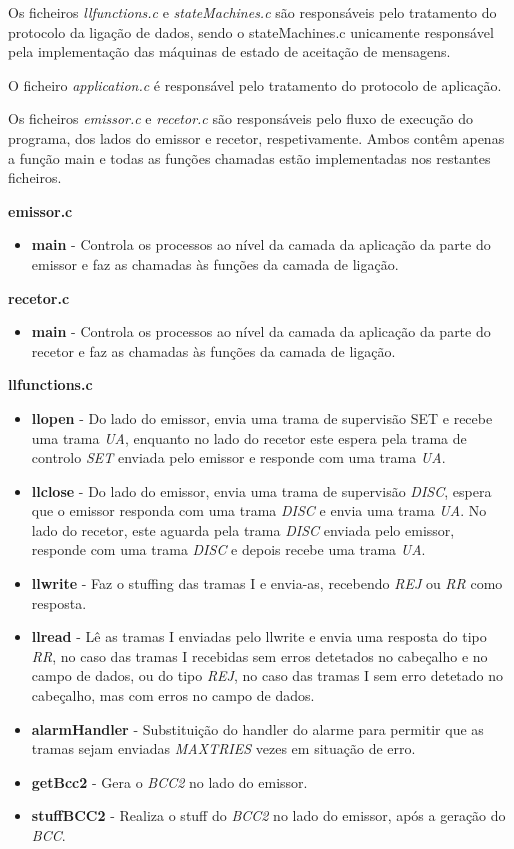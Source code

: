 \documentclass[11pt]{article}
\begin{document}
Os ficheiros \textit{llfunctions.c} e \textit{stateMachines.c} são responsáveis pelo tratamento do protocolo da ligação de dados, sendo o  stateMachines.c unicamente responsável pela implementação das máquinas de estado de aceitação de mensagens.

O ficheiro \textit{application.c} é responsável pelo tratamento do protocolo de aplicação.

Os ficheiros \textit{emissor.c} e \textit{recetor.c} são responsáveis pelo fluxo de execução do programa, dos lados do emissor e recetor, respetivamente. Ambos contêm apenas a função main e todas as funções chamadas estão implementadas nos restantes ficheiros.


\textbf{emissor.c}
\begin{itemize}
	\item \textbf{main} - Controla os processos ao nível da camada da aplicação da parte do emissor e faz as chamadas às funções da camada de ligação.
\end{itemize}


\textbf{recetor.c}
\begin{itemize}
	\item \textbf{main} - Controla os processos ao nível da camada da aplicação da parte do recetor e faz as chamadas às funções da camada de ligação.
\end{itemize}


\textbf{llfunctions.c}
\begin{itemize}
	\item \textbf{llopen} - Do lado do emissor, envia uma trama de supervisão SET e recebe uma trama \textit{UA}, enquanto no lado do recetor este espera pela trama de controlo \textit{SET} enviada pelo emissor e responde com uma trama \textit{UA}.
	\item \textbf{llclose} -  Do lado do emissor, envia uma trama de supervisão \textit{DISC}, espera que o emissor responda com uma trama \textit{DISC} e envia uma trama \textit{UA}. No lado do recetor, este aguarda pela trama \textit{DISC} enviada pelo emissor, responde com uma trama \textit{DISC} e depois recebe uma trama \textit{UA}.
	\item \textbf{llwrite} - Faz o stuffing das tramas I e envia-as, recebendo \textit{REJ} ou \textit{RR} como resposta.
	\item \textbf{llread} - Lê as tramas I enviadas pelo llwrite e envia uma resposta do tipo \textit{RR}, no caso das tramas I recebidas sem erros detetados no cabeçalho e no campo de dados, ou do tipo \textit{REJ}, no caso das tramas I sem erro detetado no cabeçalho, mas com erros no campo de dados.
	\item \textbf{alarmHandler} - Substituição do handler do alarme para permitir que as tramas sejam enviadas \textit{MAXTRIES} vezes em situação de erro.
	\item \textbf{getBcc2} - Gera o \textit{BCC2} no lado do emissor.
	\item \textbf{stuffBCC2} - Realiza o stuff do \textit{BCC2} no lado do emissor, após a geração do \textit{BCC}.
	
\end{itemize}
\end{document}
